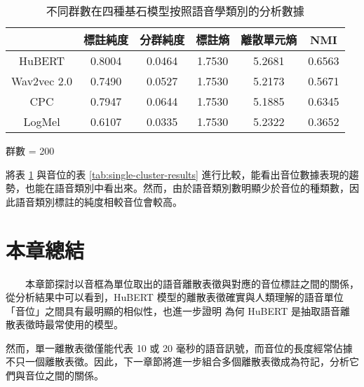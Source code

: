\begin{table}[!htbp]
            \vspace{0.2cm}        

            \begin{subtable}[t]{\textwidth}
                \centering
                \begin{tabular}{|c|c|c|c|c|c|} \hline 
                                & 標註純度 & 分群純度 & 標註熵 & 離散單元熵 &     NMI \\ \hline 
                    HuBERT      &           0.8004 &   0.0464 &         1.7530 &     5.2681 &  0.6563 \\ \hline    %
                    Wav2vec 2.0 &           0.7490 &   0.0527 &         1.7530 &     5.2173 &  0.5671 \\ \hline    %
                    CPC         &           0.7947 &   0.0644 &         1.7530 &     5.1885 &  0.6345 \\ \hline    %
                    LogMel      &           0.6107 &   0.0335 &         1.7530 &     5.2322 &  0.3652 \\ \hline    %
                \end{tabular}
                \caption{群數 = 200}
                \label{tab:ch3-clu200-pcls}
            \end{subtable}        

            \caption{不同群數在四種基石模型按照語音學類別的分析數據}
            \label{tab:single-cluster-phonetype-results}
        \end{table}
        將表 \ref{tab:single-cluster-phonetype-results} 與音位的表 \ref{tab:single-cluster-results} 進行比較，能看出音位數據表現的趨勢，也能在語音類別中看出來。然而，由於語音類別數明顯少於音位的種類數，因此語音類別標註的純度相較音位會較高。


\section{本章總結}

　　本章節探討以音框為單位取出的語音離散表徵與對應的音位標註之間的關係，從分析結果中可以看到，HuBERT 模型的離散表徵確實與人類理解的語音單位「音位」之間具有最明顯的相似性，也進一步證明
為何 HuBERT 是抽取語音離散表徵時最常使用的模型。


然而，單一離散表徵僅能代表 10 或 20 毫秒的語音訊號，而音位的長度經常佔據不只一個離散表徵。因此，下一章節將進一步組合多個離散表徵成為符記，分析它們與音位之間的關係。
